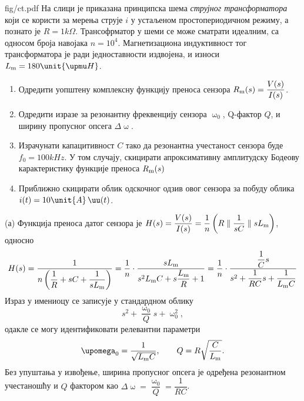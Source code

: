 \begin{slikaDesno}{fig/ct.pdf}
    \PID На слици је приказана принципска шема \textit{струјног трансформатора}
    који се користи за мерења струје $i$ у устаљеном простопериодичном режиму, 
    а познато је $R = 1\unit{k\Omega}$. 
    Трансофрматор у шеми се може сматрати идеалним, са односом броја навојака $n = 10^4$. 
    Магнетизациона индуктивност тог трансформатора је ради једноставности издвојена, и износи 
    $L_{\rm m} = 180\unit{\upmu H}$. 
\end{slikaDesno}
\begin{enumerate}[label=(\alph*)]
    \item Одредити уопштену комплексну функцију преноса сензора $R_{\rm m}(s) = \dfrac{V(s)}{I(s)}$. 
    \item Одредити изразе за резонантну фреквенцију сензора $\upomega_0$, Q-фактор $Q$, и 
    ширину пропусног опсега $\Delta \upomega$. 
    \item Израчунати капацитивност $C$ тако да резонантна учестаност сензора буде ${f_0 = 100\unit{kHz}}$. У том случају, 
    скицирати апроксимативну амплитудску Бодеову карактеристику функције преноса $R_{\rm m}(s)$
    \item Приближно скицирати облик одскочног одзив овог сензора за побуду облика $i(t) = 10\unit{A}\, \uu(t)$.
\end{enumerate}

\RESENJE 
(а) Функција преноса датог сензора је $H(s) = \dfrac{V(s)}{I(s)} = \dfrac{1}{n}\left( R \parallel \dfrac{1}{sC} \parallel sL_{\rm m} \right)$,
односно 
\begin{equation}
    H(s) = \dfrac{1}{n \left( \dfrac{1}{R} + sC + \dfrac{1}{sL_{\rm m}} \right)} 
         = \dfrac 1n \cdot \dfrac{s L_{\rm m}}{ s^2 L_{\rm m} C + s \dfrac{L_{\rm m}}{R}  + 1}
         = \dfrac 1n \cdot
         \dfrac{
            \dfrac{1}{C} s
         }{
            s^2 + \dfrac{1}{RC} s + \dfrac{1}{L_{\rm m} C}
         }
\end{equation}
Израз у имениоцу се записује у стандардном облику 
\begin{equation}
    s^2 + \dfrac{\upomega_0}{Q} s + \upomega_0^2, \label{eq:\ID:std_form}
\end{equation}
    одакле се могу идентификовати релевантни параметри
\begin{equation}
    \upomega_0 = \dfrac{1}{\sqrt{L_{\rm m} C}}, \qquad
    Q = R \sqrt{\dfrac C{L_{\rm m}}}.
\end{equation}
Без упуштања у извођење, ширина пропусног опсега је одређена резонантном учестаношћу и $Q$ фактором као 
$\Delta \upomega = \dfrac{\upomega_0}{Q} = \dfrac{1}{RC}$. 

